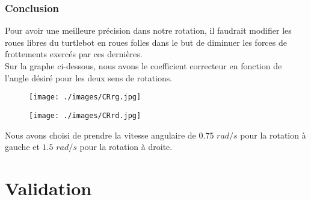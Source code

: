 \documentclass[10pt,a4paper]{article}
\begin{document}
\vspace{5mm}
\subsubsection{Conclusion}

Pour avoir une meilleure précision dans notre rotation, il faudrait modifier les roues libres du turtlebot en roues folles dans le but de diminuer les forces de frottements exercés par ces dernières. \\
Sur la graphe ci-dessous, nous avons le coefficient correcteur en fonction de l'angle désiré pour les deux sens de rotations.\\


\vspace{5mm}
\begin{figure}[h]
\begin{minipage}{0.46\linewidth}
    	\centering
        \texttt{[image: ./images/CRrg.jpg]}
    \end{minipage}\hfill
    \begin{minipage}[c]{.46\linewidth}
        \centering
        \texttt{[image: ./images/CRrd.jpg]}
    \end{minipage}
\end{figure}
\vspace{5mm}

Nous avons choisi de prendre la vitesse angulaire de $0.75$ $rad/s$ pour la rotation à gauche et $1.5$ $rad/s$ pour la rotation à droite.\\


\section{Validation}
\end{document}
